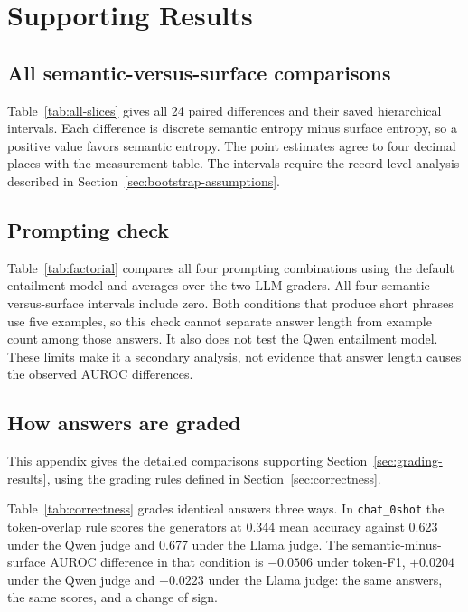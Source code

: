 \chapter{Supporting Results}
\label{app:secondary-results}

\section{All semantic-versus-surface comparisons}
\label{app:all-comparisons}

Table~\ref{tab:all-slices} gives all 24 paired differences and their saved
hierarchical intervals. Each difference is discrete semantic entropy minus
surface entropy, so a positive value favors semantic entropy. The point
estimates agree to four decimal places with the measurement table. The
intervals require the record-level analysis described in
Section~\ref{sec:bootstrap-assumptions}.



\section{Prompting check}
\label{sec:factorial-results}

Table~\ref{tab:factorial} compares all four prompting combinations using the
default entailment model and averages over the two LLM graders. All four
semantic-versus-surface intervals include zero. Both conditions that produce
short phrases use five examples, so this check cannot separate answer length
from example count among those answers. It also does not test the Qwen
entailment model. These limits make it a secondary analysis, not evidence that
answer length causes the observed AUROC differences.



\section{How answers are graded}
\label{sec:correctness-comparison}

This appendix gives the detailed comparisons supporting
Section~\ref{sec:grading-results}, using the grading rules defined in
Section~\ref{sec:correctness}.

Table~\ref{tab:correctness} grades identical answers three ways. In
\texttt{chat\_0shot} the token-overlap rule scores the generators at 0.344 mean
accuracy against 0.623 under the Qwen judge and 0.677 under the Llama judge.
The semantic-minus-surface AUROC difference in that condition is $-0.0506$ under
token-F1, $+0.0204$ under the Qwen judge and $+0.0223$ under the Llama judge:
the same answers, the same scores, and a change of sign.

